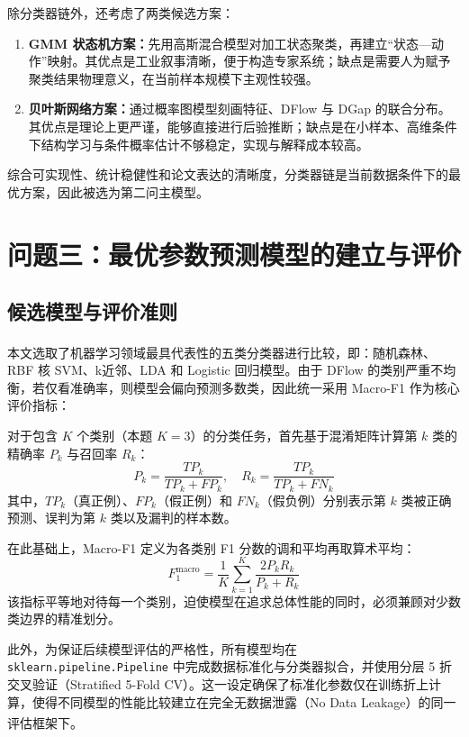 \documentclass[UTF8,a4paper,12pt]{ctexart}
\newcommand{\upcite}[1]{\textsuperscript{\cite{#1}}}
\begin{document}
除分类器链外，还考虑了两类候选方案：
\begin{enumerate}[label=(\arabic*),leftmargin=2em]
\item \textbf{GMM 状态机方案：}先用高斯混合模型对加工状态聚类，再建立“状态—动作”映射。其优点是工业叙事清晰，便于构造专家系统；缺点是需要人为赋予聚类结果物理意义，在当前样本规模下主观性较强。
\item \textbf{贝叶斯网络方案：}通过概率图模型刻画特征、DFlow 与 DGap 的联合分布。其优点是理论上更严谨，能够直接进行后验推断；缺点是在小样本、高维条件下结构学习与条件概率估计不够稳定，实现与解释成本较高。
\end{enumerate}

综合可实现性、统计稳健性和论文表达的清晰度，分类器链是当前数据条件下的最优方案，因此被选为第二问主模型。

\section{问题三：最优参数预测模型的建立与评价}
\label{sec:model}

\subsection{候选模型与评价准则}

本文选取了机器学习领域\upcite{ref2}最具代表性的五类分类器进行比较，即：随机森林、RBF 核 SVM、k近邻、LDA 和 Logistic 回归模型。由于 DFlow 的类别严重不均衡，若仅看准确率，则模型会偏向预测多数类，因此统一采用 Macro-F1 作为核心评价指标：

对于包含 $K$ 个类别（本题 $K=3$）的分类任务，首先基于混淆矩阵计算第 $k$ 类的精确率 $P_k$ 与召回率 $R_k$：
\begin{equation}
    P_k = \frac{TP_k}{TP_k + FP_k}, \quad R_k = \frac{TP_k}{TP_k + FN_k}
\end{equation}
其中，$TP_k$（真正例）、$FP_k$（假正例）和 $FN_k$（假负例）分别表示第 $k$ 类被正确预测、误判为第 $k$ 类以及漏判的样本数。

在此基础上，Macro-F1 定义为各类别 F1 分数的调和平均再取算术平均：
\begin{equation}
    F_1^{\text{macro}} = \frac{1}{K} \sum_{k=1}^{K} \frac{2 P_k R_k}{P_k + R_k}
\end{equation}
该指标平等地对待每一个类别，迫使模型在追求总体性能的同时，必须兼顾对少数类边界的精准划分。

此外，为保证后续模型评估的严格性，所有模型均在 \texttt{sklearn.pipeline.Pipeline} 中完成数据标准化与分类器拟合，并使用分层 5 折交叉验证（Stratified 5-Fold CV）。这一设定确保了标准化参数仅在训练折上计算，使得不同模型的性能比较建立在完全无数据泄露（No Data Leakage）的同一评估框架下\upcite{ref10}。
\end{document}
